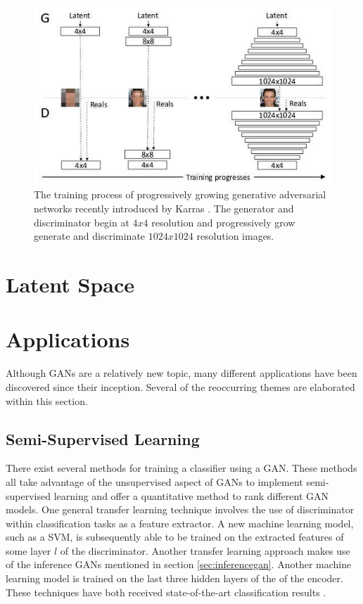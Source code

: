 \documentclass[11pt]{article}
\begin{document}
\begin{figure}
\centering
\includegraphics[scale=0.45]{progressive_growing}
\caption{The training process of progressively growing generative adversarial networks recently introduced by Karras  \citep{2017arXiv171010196K}. The generator and discriminator begin at $4x4$ resolution and progressively grow generate and discriminate $1024x1024$ resolution images.}
\label{fig:ProgressiveGrowingGAN}
\end{figure}

\section{Latent Space}
\section{Applications}
Although GANs are a relatively new topic, many different applications have been discovered since their inception. Several of the reoccurring themes are elaborated within this section.

\subsection{Semi-Supervised Learning} \label{sec:semisupervised}
There exist several methods for training a classifier using a GAN. These methods all take advantage of the unsupervised aspect of GANs to implement semi-supervised learning and offer a quantitative method to rank different GAN models. One general transfer learning technique involves the use of discriminator within classification tasks as a feature extractor. A new machine learning model, such as a SVM, is subsequently able to be trained on the extracted features of some layer $l$ of the discriminator. Another transfer learning approach makes use of the inference GANs mentioned in section \ref{sec:inferencegan}. Another machine learning model is trained on the last three hidden layers of the of the encoder. These techniques have both received state-of-the-art classification results \citep{2017arXiv171007035C}.
\end{document}
